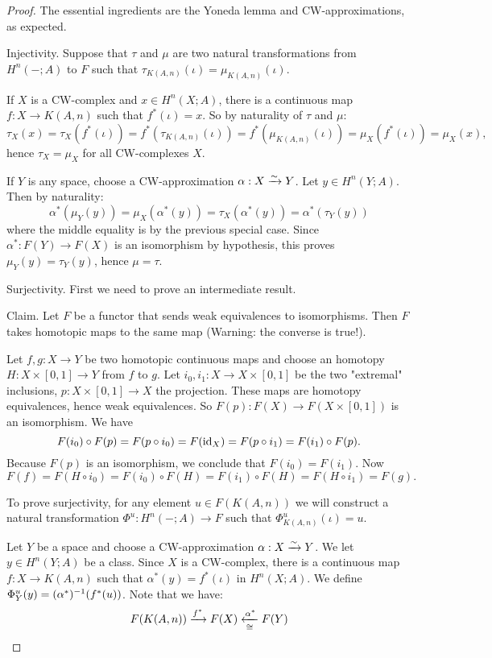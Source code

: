 \begin{proof}
The essential ingredients are the Yoneda lemma and CW-approximations, as expected.

Injectivity. Suppose that $\tau$ and $\mu$ are two natural transformations from $H^n(-;A)$ to $F$ such that $\tau_{K(A,n)}(\iota)=\mu_{K(A,n)}(\iota)$.

If $X$ is a CW-complex and $x\in H^n(X;A)$, there is a continuous map $f:X\to K(A,n)$ such that $f^*(\iota)=x$. So by naturality of $\tau$ and $\mu$:
\[\tau_X(x)=\tau_X(f^*(\iota))=f^*(\tau_{K(A,n)}(\iota))=f^*(\mu_{K(A,n)}(\iota))=\mu_X(f^*(\iota))=\mu_X(x),\]
hence $\tau_X=\mu_X$ for all CW-complexes $X$.

If $Y$ is any space, choose a CW-approximation $\alpha:X\xrightarrow{\sim} Y$. Let $y\in H^n(Y;A)$. Then by naturality:
\[\alpha^*(\mu_Y(y))=\mu_X(\alpha^*(y))=\tau_X(\alpha^*(y))=\alpha^*(\tau_Y(y))\]
where the middle equality is by the previous special case. Since $\alpha^*:F(Y)\to F(X)$ is an isomorphism by hypothesis, this proves $\mu_Y(y)=\tau_Y(y)$, hence $\mu=\tau$.

Surjectivity. First we need to prove an intermediate result.

Claim. Let $F$ be a functor that sends weak equivalences to isomorphisms. Then $F$ takes homotopic maps to the same map (Warning: the converse is  true!).

\begin{claimproof}
Let $f,g:X\to Y$ be two homotopic continuous maps and choose an homotopy $H:X\times[0,1]\to Y$ from $f$ to $g$. Let $i_0,i_1:X\to X\times[0,1]$ be the two "extremal" inclusions, $p:X\times[0,1]\to X$ the projection. These maps are homotopy equivalences, hence weak equivalences. So $F(p):F(X)\to F(X\times[0,1])$ is an isomorphism. We have
\[F(i_0)\circ F(p)=F(p\circ i_0)=F(\operatorname{id}_X)=F(p\circ i_1)=F(i_1)\circ F(p).\]
Because $F(p)$ is an isomorphism, we conclude that $F(i_0)=F(i_1)$. Now
\[F(f)=F(H\circ i_0)=F(i_0)\circ F(H)=F(i_1)\circ F(H)=F(H\circ i_1)=F(g).\]
\end{claimproof}

To prove surjectivity, for any element $u\in F(K(A,n))$ we will construct a natural transformation $\Phi^u:H^n(-;A)\to F$ such that $\Phi^u_{K(A,n)}(\iota)=u$.

Let $Y$ be a space and choose a CW-approximation $\alpha:X\xrightarrow{\sim}Y$. We let $y\in H^n(Y;A)$ be a class. Since $X$ is a CW-complex, there is a continuous map $f:X\to K(A,n)$ such that $\alpha^*(y)=f^*(\iota)$ in $H^n(X;A)$. We define $\Phi^u_Y(y)=(\alpha^*)^{-1}(f^*(u))$. Note that we have:
\[F(K(A,n))\xrightarrow{f^*}F(X)\underset{\cong}{\xleftarrow{\alpha^*}}F(Y)\]


\end{proof}
